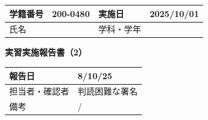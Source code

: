 \documentclass[UTF8,10pt,a4paper,fontset=fandol]{ctexart}
\newcommand{\fieldvalue}[1]{#1}
\newcommand{\handwritten}[1]{#1}
\begin{document}
\noindent
\begin{tabularx}{\textwidth}{|l|X|l|X|}
\hline
学籍番号 &
\fieldvalue{200-0480} &
実施日 &
\fieldvalue{2025/10/01} \\
\hline
氏名 & & 学科・学年 & \\
\hline
\end{tabularx}

\vspace{0.5em}

\begin{center}
\textbf{実習実施報告書（2）}
\end{center}

\noindent
\begin{tabularx}{\textwidth}{|l|X|}
\hline
報告日 &
\fieldvalue{\handwritten{8/10/25}} \\
\hline
担当者・確認者 &
\fieldvalue{\handwritten{判読困難な署名}} \\
\hline
備考 &
\fieldvalue{\handwritten{/}} \\
\hline
\end{tabularx}

\vspace{0.5em}
\end{document}

